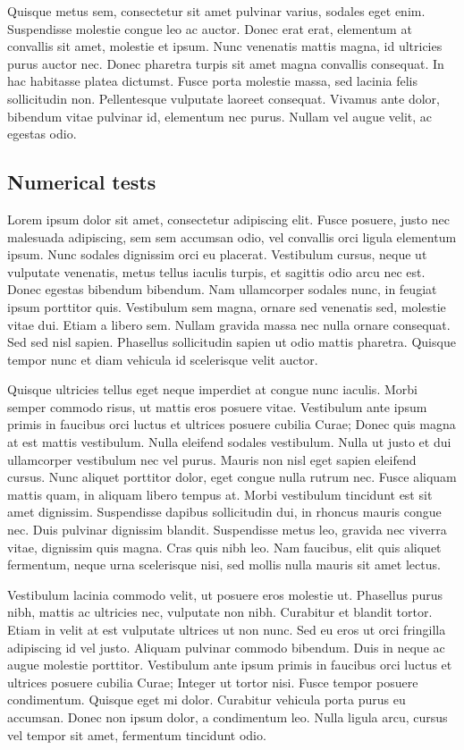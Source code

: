 Quisque metus sem, consectetur sit amet pulvinar varius, sodales eget enim. Suspendisse molestie congue leo ac auctor. Donec erat erat, elementum at convallis sit amet, molestie et ipsum. Nunc venenatis mattis magna, id ultricies purus auctor nec. Donec pharetra turpis sit amet magna convallis consequat. In hac habitasse platea dictumst. Fusce porta molestie massa, sed lacinia felis sollicitudin non. Pellentesque vulputate laoreet consequat. Vivamus ante dolor, bibendum vitae pulvinar id, elementum nec purus. Nullam vel augue velit, ac egestas odio.

\subsection{Numerical tests}

Lorem ipsum dolor sit amet, consectetur adipiscing elit. Fusce posuere, justo nec malesuada adipiscing, sem sem accumsan odio, vel convallis orci ligula elementum ipsum. Nunc sodales dignissim orci eu placerat. Vestibulum cursus, neque ut vulputate venenatis, metus tellus iaculis turpis, et sagittis odio arcu nec est. Donec egestas bibendum bibendum. Nam ullamcorper sodales nunc, in feugiat ipsum porttitor quis. Vestibulum sem magna, ornare sed venenatis sed, molestie vitae dui. Etiam a libero sem. Nullam gravida massa nec nulla ornare consequat. Sed sed nisl sapien. Phasellus sollicitudin sapien ut odio mattis pharetra. Quisque tempor nunc et diam vehicula id scelerisque velit auctor.

Quisque ultricies tellus eget neque imperdiet at congue nunc iaculis. Morbi semper commodo risus, ut mattis eros posuere vitae. Vestibulum ante ipsum primis in faucibus orci luctus et ultrices posuere cubilia Curae; Donec quis magna at est mattis vestibulum. Nulla eleifend sodales vestibulum. Nulla ut justo et dui ullamcorper vestibulum nec vel purus. Mauris non nisl eget sapien eleifend cursus. Nunc aliquet porttitor dolor, eget congue nulla rutrum nec. Fusce aliquam mattis quam, in aliquam libero tempus at. Morbi vestibulum tincidunt est sit amet dignissim. Suspendisse dapibus sollicitudin dui, in rhoncus mauris congue nec. Duis pulvinar dignissim blandit. Suspendisse metus leo, gravida nec viverra vitae, dignissim quis magna. Cras quis nibh leo. Nam faucibus, elit quis aliquet fermentum, neque urna scelerisque nisi, sed mollis nulla mauris sit amet lectus.

Vestibulum lacinia commodo velit, ut posuere eros molestie ut. Phasellus purus nibh, mattis ac ultricies nec, vulputate non nibh. Curabitur et blandit tortor. Etiam in velit at est vulputate ultrices ut non nunc. Sed eu eros ut orci fringilla adipiscing id vel justo. Aliquam pulvinar commodo bibendum. Duis in neque ac augue molestie porttitor. Vestibulum ante ipsum primis in faucibus orci luctus et ultrices posuere cubilia Curae; Integer ut tortor nisi. Fusce tempor posuere condimentum. Quisque eget mi dolor. Curabitur vehicula porta purus eu accumsan. Donec non ipsum dolor, a condimentum leo. Nulla ligula arcu, cursus vel tempor sit amet, fermentum tincidunt odio.

